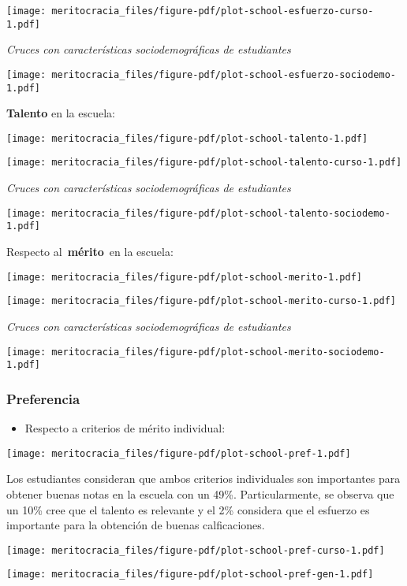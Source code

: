 \documentclass[
  letterpaper,
  DIV=11,
  numbers=noendperiod]{scrreprt}
\providecommand{\tightlist}{%
  \setlength{\itemsep}{0pt}\setlength{\parskip}{0pt}}\usepackage{longtable,booktabs,array}
\begin{document}
\texttt{[image: meritocracia\_files/figure-pdf/plot-school-esfuerzo-curso-1.pdf]}

\emph{Cruces con características sociodemográficas de estudiantes}

\texttt{[image: meritocracia\_files/figure-pdf/plot-school-esfuerzo-sociodemo-1.pdf]}

\textbf{Talento} en la escuela:

\texttt{[image: meritocracia\_files/figure-pdf/plot-school-talento-1.pdf]}

\texttt{[image: meritocracia\_files/figure-pdf/plot-school-talento-curso-1.pdf]}

\emph{Cruces con características sociodemográficas de estudiantes}

\texttt{[image: meritocracia\_files/figure-pdf/plot-school-talento-sociodemo-1.pdf]}

Respecto al~\textbf{mérito}~en la escuela:

\texttt{[image: meritocracia\_files/figure-pdf/plot-school-merito-1.pdf]}

\texttt{[image: meritocracia\_files/figure-pdf/plot-school-merito-curso-1.pdf]}

\emph{Cruces con características sociodemográficas de estudiantes}

\texttt{[image: meritocracia\_files/figure-pdf/plot-school-merito-sociodemo-1.pdf]}

\subsubsection{Preferencia}\label{preferencia}

\begin{itemize}
\tightlist
\item
  Respecto a criterios de mérito individual:
\end{itemize}

\texttt{[image: meritocracia\_files/figure-pdf/plot-school-pref-1.pdf]}

Los estudiantes consideran que ambos criterios individuales son
importantes para obtener buenas notas en la escuela con un 49\%.
Particularmente, se observa que un 10\% cree que el talento es relevante
y el 2\% considera que el esfuerzo es importante para la obtención de
buenas calficaciones.

\texttt{[image: meritocracia\_files/figure-pdf/plot-school-pref-curso-1.pdf]}

\texttt{[image: meritocracia\_files/figure-pdf/plot-school-pref-gen-1.pdf]}
\end{document}
